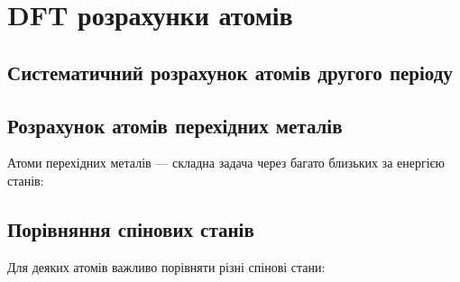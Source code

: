 
\section{DFT розрахунки атомів}


%
%


\subsection{Систематичний розрахунок атомів другого періоду}



\subsection{Розрахунок атомів перехідних металів}

Атоми перехідних металів --- складна задача через багато близьких за енергією станів:


\subsection{Порівняння спінових станів}

Для деяких атомів важливо порівняти різні спінові стани:



